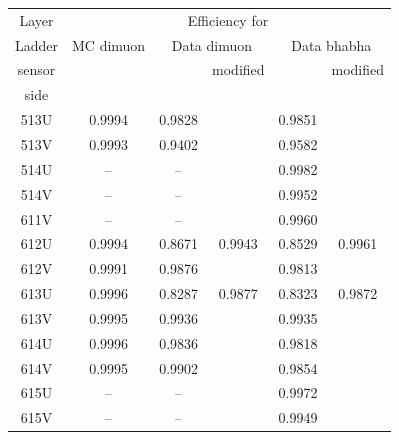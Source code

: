 \documentclass[xcolor=dvipsnames]{beamer}
\begin{document}
 		\begin{frame}
 			
 			
 			\begin{center}	
 				\begin{tabular}{|c|c|c| c|c|c|}
 					\hline
 					
 					Layer &	\multicolumn{5}{|c|}{Efficiency for }	\\ 
 					\cline{2-6}
 					Ladder &\multicolumn{1}{|c|}{MC dimuon }&\multicolumn{2}{|c|}{Data dimuon }&\multicolumn{2}{|c|}{Data bhabha }	\\ \cline{2-6} 			
 					sensor &&&modified&&modified\\
 					side &&&&&\\ \cline{2-6}	
 					\hline	
 	513U &   0.9994  & 0.9828  &           &  0.9851 &          \\  
 	513V &   0.9993  & 0.9402  &           &  0.9582 &          \\  
 	514U &   --      & --      &           &  0.9982 &          \\  
 	514V &   --      & --      &           &  0.9952 &          \\  
 	\hline
 	
 	611V &   --      & --      &           &  0.9960 &          \\  
 	612U &   0.9994  & 0.8671  &  0.9943   &  0.8529 &  0.9961  \\  
 	612V &   0.9991  & 0.9876  &           &  0.9813 &          \\  
 	613U &   0.9996  & 0.8287  &  0.9877   &  0.8323 &  0.9872  \\  
 	613V &   0.9995  & 0.9936  &           &  0.9935 &          \\  
 	614U &   0.9996  & 0.9836  &           &  0.9818 &          \\  
 	614V &   0.9995  & 0.9902  &           &  0.9854 &          \\  
 	615U &   --      & --      &           &  0.9972 &          \\  
 	615V &   --	 & --      &           &  0.9949 &           \\  
 	\hline
 		\end{tabular}
 		
 	\end{center}
 	
 \end{frame}
\end{document}
